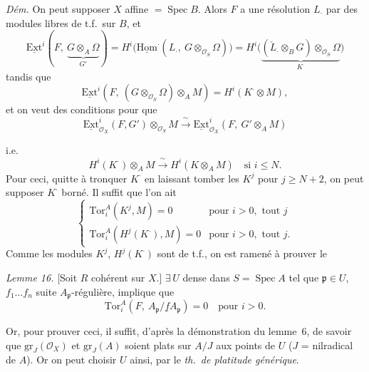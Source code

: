\documentclass[11pt,a4paper]{article}
\begin{document}
\emph{Dém.} On peut supposer $X$ affine $= \operatorname{Spec} B$. Alors $F$ a
une résolution $L_{\cdot}$ par des modules libres de t.f.\ sur $B$, et
\[
  \underline{\mathrm{Ext}}^{i}(F,\ \underbrace{G \otimes_A \Omega}_{G'})
  = H^{i}\bigl(\underline{\mathrm{Hom}}^{\cdot}(L_{\cdot},\ G \otimes_{\mathcal{O}_S} \Omega)\bigr)
  = H^{i}\bigl(\underbrace{(\check{L}_{\cdot} \otimes_B G) \otimes_{\mathcal{O}_S} \Omega}_{K^{\cdot}}\bigr)
\]
tandis que
\[
  \underline{\mathrm{Ext}}^{i}(F,\ (G \otimes_{\mathcal{O}_S} \Omega) \otimes_A M) = H^{i}(K^{\cdot} \otimes M),
\]
et on veut des conditions pour que
\[
  \underline{\mathrm{Ext}}^{i}_{\mathcal{O}_X}(F, G') \otimes_{\mathcal{O}_S} M
  \xrightarrow{\ \sim\ }
  \underline{\mathrm{Ext}}^{i}_{\mathcal{O}_X}(F,\ G' \otimes_A M)
\]

i.e.
\[
  H^{i}(K^{\cdot}) \otimes_A M \xrightarrow{\ \sim\ } H^{i}(K \otimes_A M)
  \quad \text{si } i \leq N .
\]
Pour ceci, quitte à tronquer $K^{\cdot}$ en laissant tomber les $K^{j}$ pour
$j \geq N + 2$, on peut supposer $K^{\cdot}$ borné. Il suffit que l'on ait
\[
  \begin{cases}
    \mathrm{Tor}_i^{A}(K^{j}, M) = 0 & \text{pour } i > 0, \text{ tout } j \\
    \mathrm{Tor}_i^{A}(H^{j}(K^{\cdot}), M) = 0 & \text{pour } i > 0, \text{ tout } j.
  \end{cases}
\]
Comme les modules $K^{j}$, $H^{j}(K^{\cdot})$ sont de t.f., on est ramené à
 prouver le

\emph{Lemme 16.} [Soit $R$ cohérent sur $X$.] $\exists\, U$ dense dans
$S = \operatorname{Spec} A$ tel que $\mathfrak{p} \in U$, $f_1 \ldots f_n$
\struck{\ill{}} suite $A_{\mathfrak{p}}$-régulière, implique que
\[
  \mathrm{Tor}_i^{A}(F,\ A_{\mathfrak{p}}/\underline{f} A_{\mathfrak{p}}) = 0
  \quad \text{pour } i > 0 .
\]

Or, pour prouver ceci, il suffit, d'après la démonstration du lemme~6, de
savoir que $\mathrm{gr}_J(\mathcal{O}_X)$ et $\mathrm{gr}_J(A)$ soient plats
sur $A/J$ aux points de $U$ ($J$ = nilradical de $A$). Or on peut choisir $U$
ainsi, par le \emph{th.\ de platitude générique}.
\end{document}
